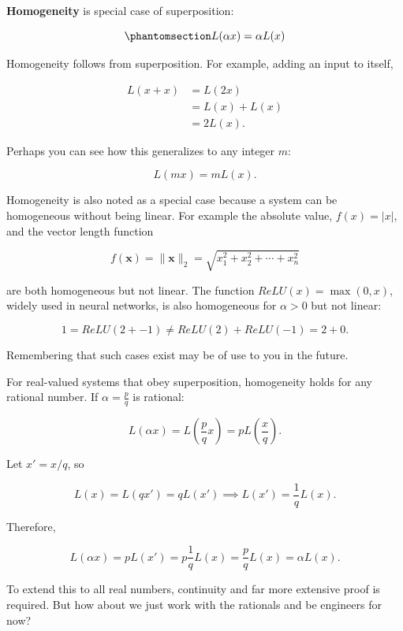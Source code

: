 \documentclass[
  letterpaper,
]{book}
\begin{document}
\textbf{Homogeneity} is special case of superposition:

\begin{equation}\phantomsection\label{eq-homogeneity}{
L(\alpha x) = \alpha L(x)
}\end{equation}

Homogeneity follows from superposition. For example, adding an input to
itself,

\[\begin{aligned}
L(x + x) &= L(2x) \nonumber  \\ 
&= L(x) + L(x) \nonumber \\
&= 2L(x) . \nonumber
\end{aligned}
\]

Perhaps you can see how this generalizes to any integer \(m\):

\[
L(m x) = m L(x).
\]

Homogeneity is also noted as a special case because a system can be
homogeneous without being linear. For example the absolute value,
\(f(x) = |x|\), and the vector length function

\[
f(\mathbf{x}) = \|\mathbf{x}\|_2 = \sqrt{x_1^2 + x_2^2 + \cdots + x_n^2}
\]

are both homogeneous but not linear. The function
\(ReLU(x) = \max(0, x)\), widely used in neural networks, is also
homogeneous for \(\alpha > 0\) but not linear:

\[
1 = ReLU(2 + -1) \neq ReLU(2) + ReLU(-1) = 2 + 0.
\]

Remembering that such cases exist may be of use to you in the future.

\begin{tcolorbox}[enhanced jigsaw, opacitybacktitle=0.6, breakable, bottomtitle=1mm, leftrule=.75mm, colframe=quarto-callout-note-color-frame, colback=white, left=2mm, opacityback=0, title=\textcolor{quarto-callout-note-color}{\faInfo}\hspace{0.5em}{Extension to Rational Numbers}, toptitle=1mm, bottomrule=.15mm, titlerule=0mm, arc=.35mm, colbacktitle=quarto-callout-note-color!10!white, toprule=.15mm, rightrule=.15mm, coltitle=black]

For real-valued systems that obey superposition, homogeneity holds for
any rational number. If \(\alpha = \frac{p}{q}\) is rational:

\[
L(\alpha x) = L\left(\frac{p}{q}x\right) = p L\left(\frac{x}{q}\right).
\]

Let \(x' = x/q\), so

\[
L(x) = L(q x') = q L(x') \implies L(x') = \frac{1}{q} L(x).
\]

Therefore,

\[
L(\alpha x) = p L(x') = p \frac{1}{q} L(x) = \frac{p}{q} L(x) = \alpha L(x).
\]

To extend this to all real numbers, continuity and far more extensive
proof is required. But how about we just work with the rationals and be
engineers for now?

\end{tcolorbox}
\end{document}
